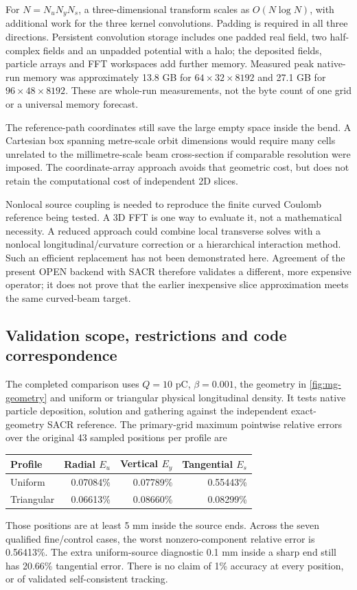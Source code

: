 For $N=N_uN_yN_s$, a three-dimensional transform scales as $O(N\log N)$,
with additional work for the three kernel convolutions. Padding is required
in all three directions. Persistent convolution storage includes one padded
real field, two half-complex fields and an unpadded potential with a halo;
the deposited fields, particle arrays and FFT workspaces add further memory.
Measured peak native-run memory was approximately 13.8 GB for
$64\times32\times8192$ and 27.1 GB for $96\times48\times8192$.
These are whole-run measurements, not the byte count of one grid or a
universal memory forecast.

The reference-path coordinates still save the large empty space inside the
bend. A Cartesian box spanning metre-scale orbit dimensions would require
many cells unrelated to the millimetre-scale beam cross-section if comparable
resolution were imposed. The coordinate-array approach avoids that geometric
cost, but does not retain the computational cost of independent 2D slices.

Nonlocal source coupling is needed to reproduce the finite curved Coulomb
reference being tested. A 3D FFT is one way to evaluate it, not a mathematical
necessity. A reduced approach could combine local transverse solves with a
nonlocal longitudinal/curvature correction or a hierarchical interaction
method. Such an efficient replacement has not been demonstrated here.
Agreement of the present OPEN backend with SACR therefore validates a
different, more expensive operator; it does not prove that the earlier
inexpensive slice approximation meets the same curved-beam target.

\clearpage
\subsection{Validation scope, restrictions and code correspondence}
The completed comparison uses $Q=10$ pC, $\beta=0.001$, the geometry in
\cref{fig:mg-geometry} and uniform or triangular physical longitudinal density.
It tests native particle deposition, solution and gathering against the
independent exact-geometry SACR reference. The primary-grid maximum pointwise
relative errors over the original 43 sampled positions per profile are
\begin{center}\small
\begin{tabular}{lrrr}\toprule
Profile & Radial $E_u$ & Vertical $E_y$ & Tangential $E_s$\\\midrule
Uniform & 0.07084\% & 0.07789\% & 0.55443\%\\
Triangular & 0.06613\% & 0.08660\% & 0.08299\%\\\bottomrule
\end{tabular}
\end{center}
Those positions are at least 5 mm inside the source ends. Across the seven
qualified fine/control cases, the worst nonzero-component relative error is
0.56413\%. The extra uniform-source diagnostic 0.1 mm inside a sharp end
still has 20.66\% tangential error. There is no claim of 1\% accuracy at every
position, or of validated self-consistent tracking.


